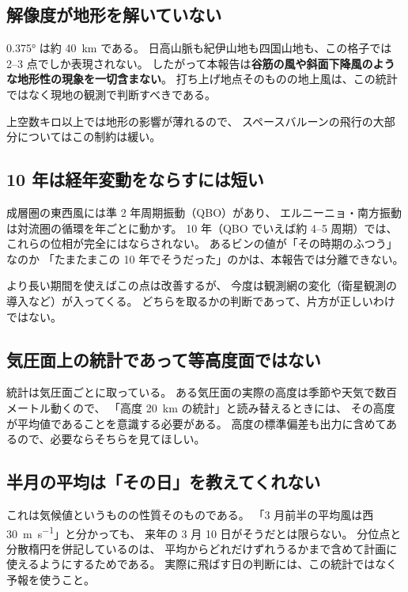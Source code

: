 \subsection{解像度が地形を解いていない}

\ang{0.375} は約 \SI{40}{\kilo\metre} である。
日高山脈も紀伊山地も四国山地も、この格子では 2--3 点でしか表現されない。
したがって本報告は\textbf{谷筋の風や斜面下降風のような地形性の現象を一切含まない}。
打ち上げ地点そのものの地上風は、この統計ではなく現地の観測で判断すべきである。

上空数キロ以上では地形の影響が薄れるので、
スペースバルーンの飛行の大部分についてはこの制約は緩い。

\subsection{10 年は経年変動をならすには短い}

成層圏の東西風には準 2 年周期振動（QBO）があり、
エルニーニョ・南方振動は対流圏の循環を年ごとに動かす。
10 年（QBO でいえば約 4--5 周期）では、これらの位相が完全にはならされない。
あるビンの値が「その時期のふつう」なのか
「たまたまこの 10 年でそうだった」のかは、本報告では分離できない。

より長い期間を使えばこの点は改善するが、
今度は観測網の変化（衛星観測の導入など）が入ってくる。
どちらを取るかの判断であって、片方が正しいわけではない。

\subsection{気圧面上の統計であって等高度面ではない}

統計は気圧面ごとに取っている。
ある気圧面の実際の高度は季節や天気で数百メートル動くので、
「高度 \SI{20}{\kilo\metre} の統計」と読み替えるときには、
その高度が平均値であることを意識する必要がある。
高度の標準偏差も出力に含めてあるので、必要ならそちらを見てほしい。

\subsection{半月の平均は「その日」を教えてくれない}

これは気候値というものの性質そのものである。
「3 月前半の平均風は西 \SI{30}{\metre\per\second}」と分かっても、
来年の 3 月 10 日がそうだとは限らない。
分位点と分散楕円を併記しているのは、
平均からどれだけずれうるかまで含めて計画に使えるようにするためである。
実際に飛ばす日の判断には、この統計ではなく予報を使うこと。
